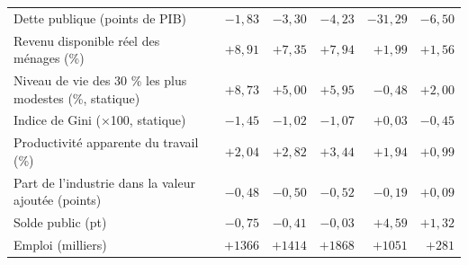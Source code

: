 \begin{tabular}{p{4.8cm}crrrrr}
Dette publique (points de PIB) & & $-1{,}83$ & $-3{,}30$ & $-4{,}23$ & $-31{,}29$ & $-6{,}50$\\
Revenu disponible réel des ménages (\%) & & $+8{,}91$ & $+7{,}35$ & $+7{,}94$ & $+1{,}99$ & $+1{,}56$\\
Niveau de vie des 30 \% les plus modestes (\%, statique) & & $+8{,}73$ & $+5{,}00$ & $+5{,}95$ & $-0{,}48$ & $+2{,}00$\\
Indice de Gini (×100, statique) & & $-1{,}45$ & $-1{,}02$ & $-1{,}07$ & $+0{,}03$ & $-0{,}45$\\
Productivité apparente du travail (\%) & & $+2{,}04$ & $+2{,}82$ & $+3{,}44$ & $+1{,}94$ & $+0{,}99$\\
Part de l'industrie dans la valeur ajoutée (points) & & $-0{,}48$ & $-0{,}50$ & $-0{,}52$ & $-0{,}19$ & $+0{,}09$\\
Solde public (pt) & & $-0{,}75$ & $-0{,}41$ & $-0{,}03$ & $+4{,}59$ & $+1{,}32$\\
Emploi (milliers) & & $+1366$ & $+1414$ & $+1868$ & $+1051$ & $+281$\\\bottomrule\end{tabular}